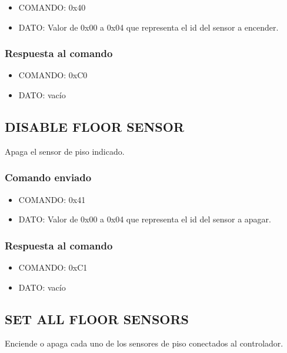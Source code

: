 \documentclass[a4paper,10pt]{article}
\begin{document}
\begin{itemize}
	\item{COMANDO:} 0x40
	\item{DATO:} Valor de 0x00 a 0x04 que representa el id del sensor a encender.
\end{itemize}

\subsubsection*{Respuesta al comando}

\begin{itemize}
	\item{COMANDO:} 0xC0
	\item{DATO:} vac\'io
\end{itemize}

\subsection{DISABLE FLOOR SENSOR}
\label{disable_fs}

Apaga el sensor de piso indicado.

\subsubsection*{Comando enviado}

\begin{itemize}
	\item{COMANDO:} 0x41
	\item{DATO:} Valor de 0x00 a 0x04 que representa el id del sensor a apagar.
\end{itemize}

\subsubsection*{Respuesta al comando}

\begin{itemize}
	\item{COMANDO:} 0xC1
	\item{DATO:} vac\'io
\end{itemize}

\subsection{SET ALL FLOOR SENSORS}
\label{set_all_fs}

Enciende o apaga cada uno de los sensores de piso conectados al controlador.
\end{document}
